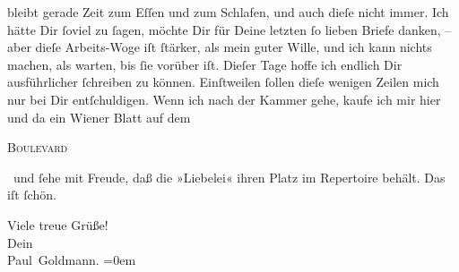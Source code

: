                bleibt gerade Zeit zum Eſſen und zum Schlafen, und auch dieſe nicht immer. Ich hätte Dir{ }ſoviel zu{ }ſagen, möchte Dir für Deine
               letzten{ }ſo lieben Briefe danken, – aber dieſe Arbeits-Woge iſt{ }ſtärker, als mein
               guter Wille, und ich kann nichts machen, als warten, bis{ }ſie vorüber iſt. Dieſer Tage
               hoffe ich endlich Dir ausführlicher{ }ſchreiben zu können. Einſtweilen{ }ſollen dieſe
               wenigen Zeilen mich nur bei Dir entſchuldigen. Wenn ich nach der Kammer gehe, kaufe ich mir hier und da ein
                  Wiener Blatt auf dem \begin{otherlanguage}{french}\textsc{Boulevard}\end{otherlanguage} und{ }ſehe mit Freude, daß die »Liebelei«  ihren {\pb}Platz im Repertoire behält. \strikeout{\textcolor{gray}{×}\-\textcolor{gray}{×}\-\textcolor{gray}{×}\-\textcolor{gray}{×}\-\textcolor{gray}{×}} Das iſt{ }ſchön.\pend
           
\pstart
           Viele treue Grüße! {\\[\baselineskip]}Dein {\\[\baselineskip]}\spacefill\mbox{Paul Goldmann.}\pend
           \leftskip=0em{}\endnumbering{}  \newcommand{\dateiname}{L02754}\newcommand{\titel}{Paul Goldmann an Arthur Schnitzler, 6. 11. [1895]}\newcommand{\editorInnen}{Martin Anton Müller und Laura Untner}
